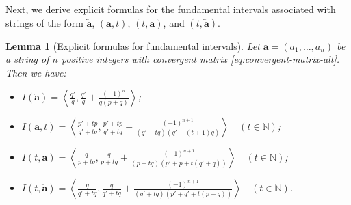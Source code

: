 \documentclass[10pt]{article}
\newtheorem{lemma}{Lemma}
\theoremstyle{definition}
\numberwithin{equation}{section}
\numberwithin{lemma}{section}
\newcommand{\NN}{\mathbb{N}}
\newcommand{\bfa}{\mathbf{a}}
\newcommand{\bfar}{\overleftarrow{\bfa}}
\newcommand{\Fundint}[1]{\left\langle #1\right\rangle}
\begin{document}
Next, we derive explicit formulas for the fundamental intervals
associated with strings of the form $\bfar$, $(\bfa,t)$, $(t,\bfa)$, and
$(t,\bfar)$.

\begin{lemma}
[Explicit formulas for fundamental intervals]
\label{lem:fundamental-intervals1}
Let $\bfa=(a_1,\dots,a_n)$
be a string of $n$ positive integers with convergent matrix
\eqref{eq:convergent-matrix-alt}. Then we have:
\begin{itemize}
\item[(i)]
$\displaystyle I(\bfar)=
\Fundint{\frac{q'}{q},\frac{q'}{q}+\frac{(-1)^n}{q(p+q)}}$;

\item[(ii)]
$\displaystyle I(\bfa,t)=
\Fundint{\frac{p'+tp}{q'+tq},
\frac{p'+tp}{q'+tq}+\frac{(-1)^{n+1}}{(q'+tq)(q'+(t+1)q)}}
\quad(t\in\NN)$;

\item[(iii)]
$\displaystyle I(t,\bfa)=
\Fundint{\frac{q}{p+tq},\frac{q}{p+tq}+\frac{(-1)^{n+1}}{(p+tq)(p'+p +
t(q'+q))}} \quad(t\in\NN)$;

\item[(iv)]
$\displaystyle I(t,\bfar)=
\Fundint{\frac{q}{q'+tq},\frac{q}{q'+tq}+
\frac{(-1)^{n+1}}{(q'+tq)(p'+q'+t(p+q))}}
\quad(t\in\NN)$.

\end{itemize}

\end{lemma}
\end{document}
